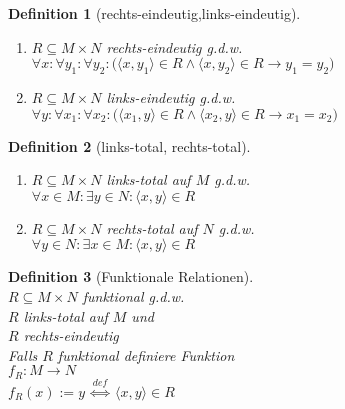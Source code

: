 \documentclass{article}
\def\pair(#1,#2){\langle #1, #2 \rangle}
\newtheorem{Definition}{Definition}
\begin{document}
\begin{Definition}[rechts-eindeutig,links-eindeutig] \hspace*{\fill} \\[-0.5cm]
  \begin{enumerate}
  \item $R \subseteq M \times N$ \emph{rechts-eindeutig} g.d.w. \\[0.1cm]
        \hspace*{1.3cm} 
        $\forall x \colon \forall y_1 \colon \forall y_2 \colon \bigl(\langle x, y_1 \rangle \in R \wedge \langle x, y_2 \rangle \in R \rightarrow y_1 = y_2\bigr)$
  \item $R \subseteq M \times N$ \emph{links-eindeutig} g.d.w.  \\[0.1cm]
        \hspace*{1.3cm} 
        $\forall y \colon \forall x_1 \colon \forall x_2 \colon \bigl(\langle x_1, y \rangle \in R \wedge \langle x_2, y \rangle \in R \rightarrow x_1 = x_2\bigr)$
  \end{enumerate}
\end{Definition}

\begin{Definition}[links-total, rechts-total] \hspace*{\fill} \\[-0.5cm]
  \begin{enumerate}
  \item $R \subseteq M \times N$ \emph{links-total auf $M$} g.d.w. \\[0.1cm]
        \hspace*{1.3cm} $\forall x \in M \colon \exists y \in N \colon \pair(x,y) \in R$ 
  \item $R \subseteq M \times N$  \emph{rechts-total auf $N$} g.d.w. \\[0.1cm]
        \hspace*{1.3cm} $\forall y \in N \colon \exists x \in M \colon \pair(x,y) \in R$
  \end{enumerate}
\end{Definition}

\begin{Definition}[Funktionale Relationen] \hspace*{\fill} \\[0.1cm]
 $R \subseteq M \times N$ funktional g.d.w. \\[0.1cm]
\hspace*{1.3cm} $R$ links-total auf $M$  und \\[0.1cm]
\hspace*{1.3cm} $R$ rechts-eindeutig \\[0.2cm]
Falls $R$ funktional definiere Funktion 
\\[0.1cm]
\hspace*{1.3cm} $f_R\colon M \rightarrow N$ \\[0.1cm]
\hspace*{1.3cm} $f_R(x) := y \;\stackrel{de\!f}{\Longleftrightarrow}\; \pair(x,y) \in R$
\end{Definition}
\end{document}
